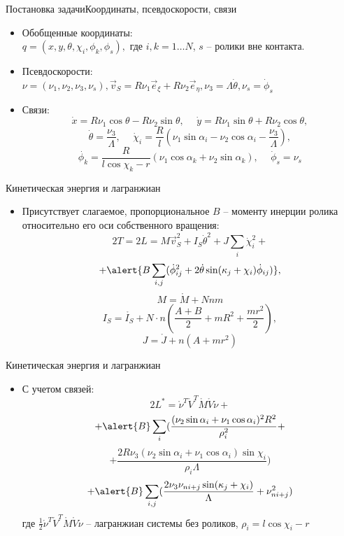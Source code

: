 \begin{frame}{Постановка задачи}{Координаты, псевдоскорости, связи}
  \begin{itemize}
  \item {
    Обобщенные координаты: \\
    $q = (x, y, \theta, \chi_i, \phi_k, \phi_s),$ где $i,k = 1\dots N$, $s$ -- ролики вне контакта.
  }
  \item{
    Псевдоскорости:\\
    $\nu = (\nu_1, \nu_2, \nu_3, \nu_s), \vec{v}_S = R\nu_1\vec{e}_\xi + R\nu_2\vec{e}_\eta, \nu_3 = \Lambda\dot{\theta}, \nu_s = \dot{\phi}_s$
  }
  \item {
    Связи:
	$$ \dot{x} = R \nu_1\cos\theta-R\nu_2\sin\theta, \hspace{15pt} \dot{y} = R\nu_1\sin\theta+R\nu_2\cos\theta,$$
	$$\dot{\theta} = \frac{\nu_3}{\Lambda}, \hspace{15pt} \dot{\chi}_i = \frac{R}{l}(\nu_1\sin\alpha_i - \nu_2\cos\alpha_i - \frac{\nu_3}{\Lambda}), $$
	$$ \dot{\phi_k} = \frac{R}{l\cos\chi_k-r}(\nu_1\cos\alpha_k + \nu_2\sin\alpha_k), \hspace{15pt} \dot{\phi}_s = \nu_s $$
  }

  \end{itemize}
\end{frame}

\begin{frame}{Кинетическая энергия и лагранжиан}
  \begin{itemize}
  \item {
    Присутствует слагаемое, пропорциональное $B$ -- моменту инерции ролика относительно его оси собственного вращения:
    $$ 2T = 2L = M\vec{v}_S^2 + I_S\dot{\theta}^2 + J\sum_i\dot{\chi}_i^2 + $$
    $$ + \alert{B\sum_{i,j}(\dot{\phi}_{ij}^2 + 2\dot{\theta}\sin(\kappa_j + \chi_i)\dot{\phi}_{ij})}, $$
    $$ M = \mathring{M} + Nnm $$
    $$ I_S = \mathring{I_S} + N\cdot n(\frac{A+B}{2} + mR^2 + \frac{mr^2}{2}), $$
    $$ J = \mathring{J} + n(A + mr^2) $$
  }

  \end{itemize}
\end{frame}

\begin{frame}{Кинетическая энергия и лагранжиан}
  \begin{itemize}
  \item {
    С учетом связей:
    $$ 2L^{*} = \mathring{\nu}^T \mathring{V}^T \mathring{M} \mathring{V} \mathring{\nu} + $$
    $$ + \alert{B}\sum_{i}(
    	\frac{(\nu_2\sin\alpha_i+\nu_1\cos\alpha_i)^2R^2}
    	{\rho_i^2} + $$
    $$ +
    	\frac{2R\nu_3(\nu_2\sin\alpha_i+\nu_1\cos\alpha_i)\sin\chi_i}
    	{\rho_i\Lambda}
    ) $$
    $$ +
    \alert{B}\sum_{i,j}(
    	\frac{2\nu_3\nu_{ni+j}\sin(\kappa_j+\chi_i)}
    	{\Lambda}
    	+
    	\nu_{ni+j}^2
    )
    $$
    где $ \frac{1}{2}\mathring{\nu}^T \mathring{V}^T \mathring{M} \mathring{V} \mathring{\nu} $ -- лагранжиан системы без роликов, $\rho_i = l\cos\chi_i - r$
  }

  \end{itemize}
\end{frame}

